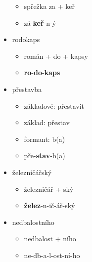 \begin{itemize}
\begin{itemize}
	\item spřežka za + keř
	\item zá-\textbf{keř}-n-ý
	\end{itemize}
\item rodokaps
	\begin{itemize}
	\item román + do + kapsy
	\item \textbf{ro}-\textbf{do}-\textbf{kaps}
	\end{itemize}
\item přestavba
	\begin{itemize}
	\item základové: přestavit
	\item základ: přestav
	\item formant: b(a)
	\item pře-\textbf{stav}-b(a)
	\end{itemize}
\item železničářský
	\begin{itemize}
	\item železničář + ský
	\item \textbf{želez}-n-ič-ář-ský
	\end{itemize}
\item nedbalostního	
	\begin{itemize}
	\item nedbalost + ního
	\item ne-db-a-l-ost-ní-ho
	\end{itemize}
\end{itemize}

